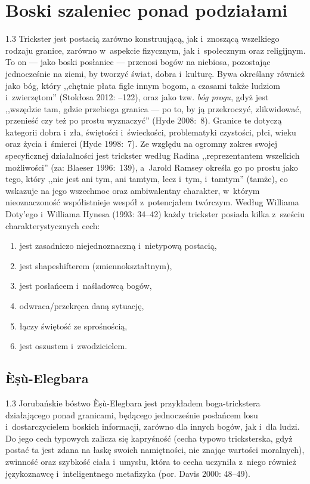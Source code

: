 \documentclass[11pt,a4paper,twoside]{report}
\begin{document}
\chapter{Boski szaleniec ponad podziałami}
\begin{spacing}{1.3}
Trickster jest postacią zarówno konstruującą, jak i~znoszącą wszelkiego rodzaju granice, zarówno w~aspekcie fizycznym, jak i~społecznym oraz religijnym. To on --- jako boski posłaniec --- przenosi bogów na niebiosa, pozostając jednocześnie na ziemi, by tworzyć świat, dobra i~kulturę. Bywa określany również jako bóg, który ,,chętnie płata figle innym bogom, a czasami także ludziom i~zwierzętom'' (Stokłosa 2012: --122), oraz jako tzw. \emph{bóg progu}, gdyż jest ,,wszędzie tam, gdzie przebiega granica --- po to, by ją przekroczyć, zlikwidować, przenieść czy też po prostu wyznaczyć'' (Hyde 2008:~8). Granice te dotyczą kategorii dobra i~zła, świętości i~świeckości, problematyki czystości, płci, wieku oraz życia i~śmierci (Hyde 1998:~7). Ze względu na ogromny zakres swojej specyficznej działalności jest trickster według Radina ,,reprezentantem wszelkich możliwości'' (za: Blaeser 1996:~139), a~Jarold Ramsey określa go po prostu jako tego, który ,,nie jest ani tym, ani tamtym, lecz i~tym, i~tamtym'' (tamże), co wskazuje na jego wszechmoc oraz ambiwalentny charakter, w~którym nieoznaczoność współistnieje wespół z~potencjałem twórczym. Według Williama Doty’ego i~Williama Hynesa (1993: 34--42) każdy trickster posiada kilka z~sześciu charakterystycznych cech:

\begin{enumerate}[1)]
  \item jest zasadniczo niejednoznaczną i~nietypową postacią,
  \item jest shapeshifterem (zmiennokształtnym),
  \item jest posłańcem i~naśladowcą bogów,
  \item odwraca/przekręca daną sytuację,
  \item łączy świętość ze sprośnością,
  \item jest oszustem i~zwodzicielem.
\end{enumerate}
\end{spacing}

\pagebreak
\vspace*{1\baselineskip}
\section{\`{E}\d{s}\`{u}-Elegbara}
\begin{spacing}{1.3}
Jorubańskie bóstwo \`{E}\d{s}\`{u}-Elegbara jest przykładem boga-trickstera działającego ponad granicami, będącego jednocześnie posłańcem losu i~dostarczycielem boskich informacji, zarówno dla innych bogów, jak i~dla ludzi. Do jego cech typowych zalicza się kapryśność (cecha typowo tricksterska, gdyż postać ta jest zdana na łaskę swoich namiętności, nie znając wartości moralnych), zwinność oraz szybkość ciała i~umysłu, która to cecha uczyniła z~niego również językoznawcę i~inteligentnego metafizyka (por. Davis 2000: 48--49).
\end{spacing}
\end{document}
